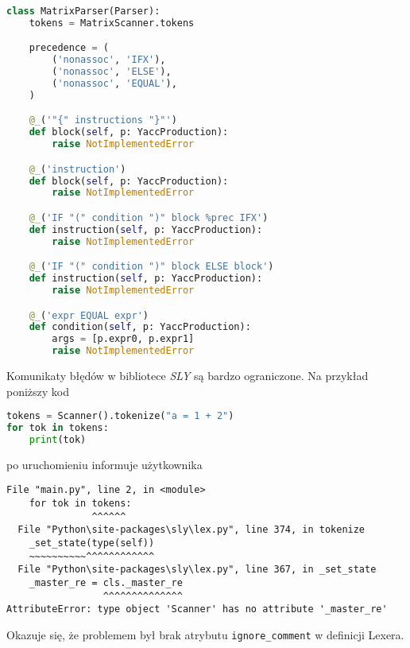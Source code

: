 \begin{lstlisting}[language=Python,float=!htbp,caption={Fragment definicji parsera w Pythonie, wykorzystujacy bibliotekę SLY},label={lst:lstlisting3}]
    class MatrixParser(Parser):
    tokens = MatrixScanner.tokens

    precedence = (
        ('nonassoc', 'IFX'),
        ('nonassoc', 'ELSE'),
        ('nonassoc', 'EQUAL'),
    )

    @_('"{" instructions "}"')
    def block(self, p: YaccProduction):
        raise NotImplementedError

    @_('instruction')
    def block(self, p: YaccProduction):
        raise NotImplementedError

    @_('IF "(" condition ")" block %prec IFX')
    def instruction(self, p: YaccProduction):
        raise NotImplementedError

    @_('IF "(" condition ")" block ELSE block')
    def instruction(self, p: YaccProduction):
        raise NotImplementedError

    @_('expr EQUAL expr')
    def condition(self, p: YaccProduction):
        args = [p.expr0, p.expr1]
        raise NotImplementedError

\end{lstlisting}

Komunikaty błędów w bibliotece \textit{SLY} są bardzo ograniczone.
Na przykład poniższy kod %
\begin{lstlisting}[language=Python,float=!htbp,caption={Fragment niedziałajacego kodu w Pythonie, wykorzystujacy bibliotekę SLY},label=lst:maximum]
tokens = Scanner().tokenize("a = 1 + 2")
for tok in tokens:
    print(tok)

\end{lstlisting}

po uruchomieniu informuje użytkownika
\begin{lstlisting}[language=terminal, caption={Przykład komunikatu błędu w bibliotece \textit{SLY}},label={lst:lstlisting}]
  File "main.py", line 2, in <module>
    for tok in tokens:
               ^^^^^^
  File "Python\site-packages\sly\lex.py", line 374, in tokenize
    _set_state(type(self))
    ~~~~~~~~~~^^^^^^^^^^^^
  File "Python\site-packages\sly\lex.py", line 367, in _set_state
    _master_re = cls._master_re
                 ^^^^^^^^^^^^^^
AttributeError: type object 'Scanner' has no attribute '_master_re'
\end{lstlisting}

Okazuje się, że problemem był brak atrybutu \verb|ignore_comment| w definicji Lexera.

